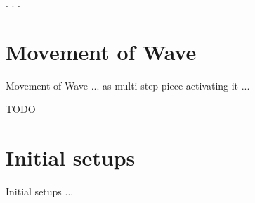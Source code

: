 . . .

\clearpage %

\section*{Movement of Wave}
\label{sec:Appendix/Movement of Wave}

Movement of Wave ... as multi-step piece activating it  ...


\huge{TODO}
\normalsize{}

\clearpage %

\section*{Initial setups}
\label{sec:Appendix/Initial setups}
Initial setups ...







